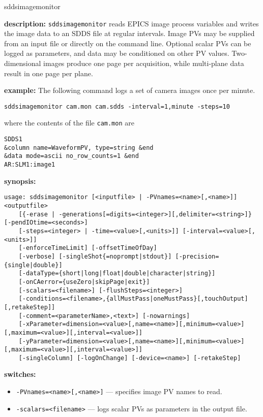 %
%
\begin{sddsprog}{sddsimagemonitor}
\item {\bf description:}
\verb+sddsimagemonitor+ reads EPICS image process variables and writes the image
  data to an SDDS file at regular intervals. Image PVs may be supplied from an
  input file or directly on the command line. Optional scalar PVs can be logged as
  parameters, and data may be conditioned on other PV values. Two-dimensional
  images produce one page per acquisition, while multi-plane data result in one
  page per plane.
\item {\bf example:}
The following command logs a set of camera images once per minute.
\begin{verbatim}
sddsimagemonitor cam.mon cam.sdds -interval=1,minute -steps=10
\end{verbatim}
where the contents of the file \verb+cam.mon+ are
\begin{verbatim}
SDDS1
&column name=WaveformPV, type=string &end
&data mode=ascii no_row_counts=1 &end
AR:SLM1:image1
\end{verbatim}
\item {\bf synopsis:}
\begin{verbatim}
usage: sddsimagemonitor [<inputfile> | -PVnames=<name>[,<name>]] <outputfile>
    [{-erase | -generations[=digits=<integer>][,delimiter=<string>]} [-pendIOtime=<seconds>]
    [-steps=<integer> | -time=<value>[,<units>]] [-interval=<value>[,<units>]]
    [-enforceTimeLimit] [-offsetTimeOfDay]
    [-verbose] [-singleShot{=noprompt|stdout}] [-precision={single|double}]
    [-dataType={short|long|float|double|character|string}]
    [-onCAerror={useZero|skipPage|exit}]
    [-scalars=<filename>] [-flushSteps=<integer>]
    [-conditions=<filename>,{allMustPass|oneMustPass}[,touchOutput][,retakeStep]]
    [-comment=<parameterName>,<text>] [-nowarnings]
    [-xParameter=dimension=<value>[,name=<name>][,minimum=<value>][,maximum=<value>][,interval=<value>]]
    [-yParameter=dimension=<value>[,name=<name>][,minimum=<value>][,maximum=<value>][,interval=<value>]]
    [-singleColumn] [-logOnChange] [-device=<name>] [-retakeStep]
\end{verbatim}
\item {\bf switches:}
  \begin{itemize}
  \item {\verb+-PVnames=<name>[,<name>]+} --- specifies image PV names to read.
  \item {\verb+-scalars=<filename>+} --- logs scalar PVs as parameters in the output file.

\end{itemize}
\end{sddsprog}
